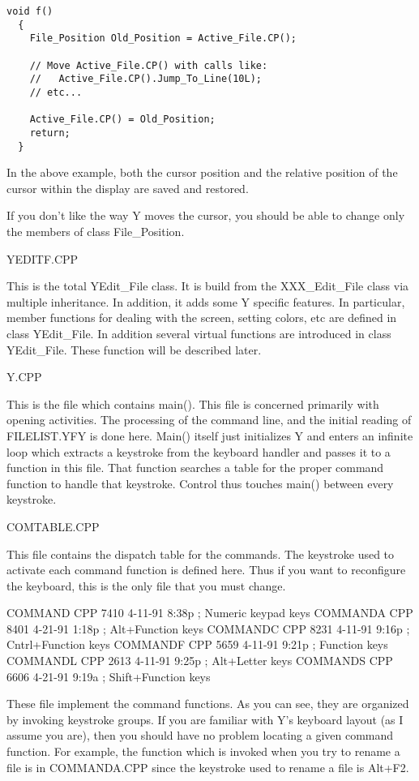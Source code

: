 \begin{verbatim}
void f()
  {
    File_Position Old_Position = Active_File.CP();

    // Move Active_File.CP() with calls like:
    //   Active_File.CP().Jump_To_Line(10L);
    // etc...

    Active_File.CP() = Old_Position;
    return;
  }
\end{verbatim}

In the above example, both the cursor position and the relative position of the cursor within
the display are saved and restored.

If you don't like the way Y moves the cursor, you should be able to change only the members of
class File\_Position.

YEDITF.CPP

This is the total YEdit\_File class. It is build from the XXX\_Edit\_File class via multiple
inheritance. In addition, it adds some Y specific features. In particular, member functions for
dealing with the screen, setting colors, etc are defined in class YEdit\_File. In addition
several virtual functions are introduced in class YEdit\_File. These function will be described
later.

Y.CPP

This is the file which contains main(). This file is concerned primarily with opening
activities. The processing of the command line, and the initial reading of FILELIST.YFY is done
here. Main() itself just initializes Y and enters an infinite loop which extracts a keystroke
from the keyboard handler and passes it to a function in this file. That function searches a
table for the proper command function to handle that keystroke. Control thus touches main()
between every keystroke.

COMTABLE.CPP

This file contains the dispatch table for the commands. The keystroke used to activate each
command function is defined here. Thus if you want to reconfigure the keyboard, this is the only
file that you must change.

COMMAND  CPP     7410   4-11-91   8:38p ; Numeric keypad keys
COMMANDA CPP     8401   4-21-91   1:18p ; Alt+Function keys
COMMANDC CPP     8231   4-11-91   9:16p ; Cntrl+Function keys
COMMANDF CPP     5659   4-11-91   9:21p ; Function keys
COMMANDL CPP     2613   4-11-91   9:25p ; Alt+Letter keys
COMMANDS CPP     6606   4-21-91   9:19a ; Shift+Function keys

These file implement the command functions. As you can see, they are organized by invoking
keystroke groups. If you are familiar with Y's keyboard layout (as I assume you are), then you
should have no problem locating a given command function. For example, the function which is
invoked when you try to rename a file is in COMMANDA.CPP since the keystroke used to rename a
file is Alt+F2.

